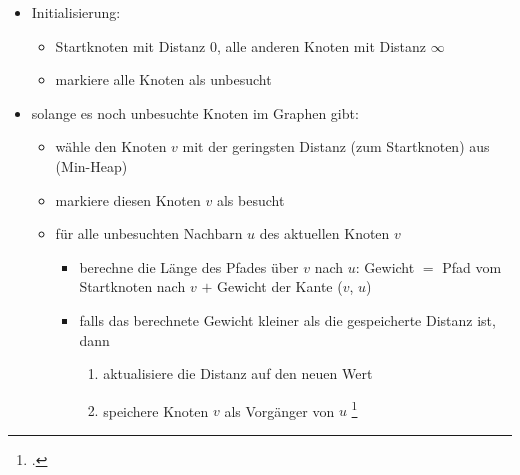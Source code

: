 \documentclass{bschlangaul-haupt}
\begin{document}
\begin{itemize}
\item Initialisierung:

\begin{itemize}
\item Startknoten mit Distanz $0$, alle anderen Knoten mit Distanz
$\infty$

\item markiere alle Knoten als unbesucht
\end{itemize}

\item solange es noch unbesuchte Knoten im Graphen gibt:

\begin{itemize}
\item wähle den Knoten $v$ mit der geringsten Distanz (zum Startknoten)
aus (Min-Heap)

\item markiere diesen Knoten $v$ als besucht

\item für alle unbesuchten Nachbarn $u$ des aktuellen Knoten $v$

\begin{itemize}
\item berechne die Länge des Pfades über $v$ nach $u$: Gewicht $=$ Pfad
vom Startknoten nach $v$ $+$ Gewicht der Kante ($v$, $u$)

\item falls das berechnete Gewicht kleiner als die gespeicherte Distanz
ist, dann

\begin{enumerate}
\item aktualisiere die Distanz auf den neuen Wert
\item speichere Knoten $v$ als Vorgänger von $u$
\footcite[Seite 12]{aud:fs:6}
\end{enumerate}
\end{itemize}
\end{itemize}
\end{itemize}


\literatur
\end{document}
